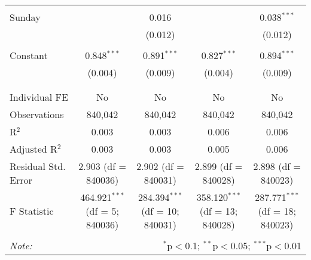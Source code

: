 \documentclass[
]{article}
\begin{document}
\begin{table}[!htbp]
{\begin{tabular}{@{\extracolsep{5pt}}lcccc}
  & & & & \\ 
 Sunday &  & 0.016 &  & 0.038$^{***}$ \\ 
  &  & (0.012) &  & (0.012) \\ 
  & & & & \\ 
 Constant & 0.848$^{***}$ & 0.891$^{***}$ & 0.827$^{***}$ & 0.894$^{***}$ \\ 
  & (0.004) & (0.009) & (0.004) & (0.009) \\ 
  & & & & \\ 
\hline \\[-1.8ex] 
Individual FE & No & No & No & No \\ 
Observations & 840,042 & 840,042 & 840,042 & 840,042 \\ 
R$^{2}$ & 0.003 & 0.003 & 0.006 & 0.006 \\ 
Adjusted R$^{2}$ & 0.003 & 0.003 & 0.005 & 0.006 \\ 
Residual Std. Error & 2.903 (df = 840036) & 2.902 (df = 840031) & 2.899 (df = 840028) & 2.898 (df = 840023) \\ 
F Statistic & 464.921$^{***}$ (df = 5; 840036) & 284.394$^{***}$ (df = 10; 840031) & 358.120$^{***}$ (df = 13; 840028) & 287.771$^{***}$ (df = 18; 840023) \\ 
\hline 
\hline \\[-1.8ex] 
\textit{Note:}  & \multicolumn{4}{r}{$^{*}$p$<$0.1; $^{**}$p$<$0.05; $^{***}$p$<$0.01} \\ 
\end{tabular}
} 
\end{table} 
\newpage
\end{document}
